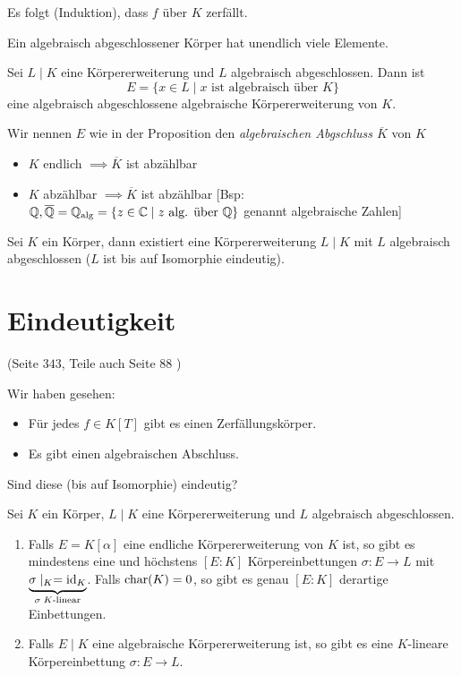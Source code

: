Es folgt (Induktion), dass $f$ über $K$ zerfällt.

\begin{remark}
	Ein algebraisch abgeschlossener Körper hat unendlich viele Elemente.
\end{remark}

\begin{proposition}
	Sei $L \mid K$ eine Körpererweiterung und $L$ algebraisch abgeschlossen.
	Dann ist 
	\[
		E = \{x \in L \mid x \text{ ist algebraisch über } K\}
	\]
	eine algebraisch abgeschlossene algebraische Körpererweiterung von $K$.
\end{proposition}

\begin{definition}
	Wir nennen $E$ wie in der Proposition den \emph{algebraischen Abgschluss $\overline{K}$ } von $K$
\end{definition}


\begin{remark}
	\begin{itemize}
		\item $K$ endlich $\implies \overline{K}$ ist abzählbar
		\item $K$ abzählbar $\implies \overline{K}$ ist abzählbar [Bsp: $\mathbb{Q}, \overline{\mathbb{Q}} = \mathbb{Q}_{\operatorname{alg}} = \{z \in \mathbb{C} \mid z \text{ alg. über } \mathbb{Q}\}$ genannt algebraische Zahlen]
	\end{itemize}
\end{remark}

\begin{theorem}
	Sei $K$ ein Körper, dann existiert eine Körpererweiterung $L \mid K$ mit $L$ algebraisch abgeschlossen ($L$ ist bis auf Isomorphie eindeutig).
\end{theorem}


\section{Eindeutigkeit}
(Seite $343$, Teile auch Seite $88$ )

Wir haben gesehen: 
\begin{itemize}
	\item Für jedes $f \in K[T]$ gibt es einen Zerfällungskörper.
	\item Es gibt einen algebraischen Abschluss.
\end{itemize}
Sind diese (bis auf Isomorphie) eindeutig?

\begin{theorem}
	Sei $K$ ein Körper, $L \mid K$ eine Körpererweiterung und $L$ algebraisch abgeschlossen.
	\begin{enumerate}
		\item Falls $E = K[\alpha]$ eine endliche Körpererweiterung von $K$ ist, so gibt es mindestens eine
			und höchstens $[E:K]$ Körpereinbettungen $\sigma: E \to L$ mit $\underbrace{\sigma \mid_{K} = \operatorname{id}_{K}}_{\sigma \; K\text{-linear}}$.
			Falls $\operatorname{char}(K)=0$, so gibt es genau $[E:K]$ derartige Einbettungen.
		\item Falls $E \mid K$ eine algebraische Körpererweiterung ist, so gibt es eine $K$-lineare Körpereinbettung
			$\sigma: E \to L$.
	\end{enumerate}
\end{theorem}

